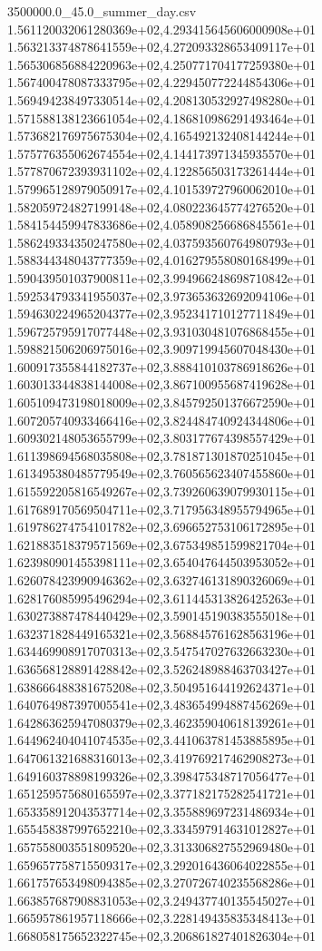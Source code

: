 \begin{filecontents*}{3500000.0_45.0_summer_day.csv}
1.561120032061280369e+02,4.293415645606000908e+01
1.563213374878641559e+02,4.272093328653409117e+01
1.565306856884220963e+02,4.250771704177259380e+01
1.567400478087333795e+02,4.229450772244854306e+01
1.569494238497330514e+02,4.208130532927498280e+01
1.571588138123661054e+02,4.186810986291493464e+01
1.573682176975675304e+02,4.165492132408144244e+01
1.575776355062674554e+02,4.144173971345935570e+01
1.577870672393931102e+02,4.122856503173261444e+01
1.579965128979050917e+02,4.101539727960062010e+01
1.582059724827199148e+02,4.080223645774276520e+01
1.584154459947833686e+02,4.058908256686845561e+01
1.586249334350247580e+02,4.037593560764980793e+01
1.588344348043777359e+02,4.016279558080168499e+01
1.590439501037900811e+02,3.994966248698710842e+01
1.592534793341955037e+02,3.973653632692094106e+01
1.594630224965204377e+02,3.952341710127711849e+01
1.596725795917077448e+02,3.931030481076868455e+01
1.598821506206975016e+02,3.909719945607048430e+01
1.600917355844182737e+02,3.888410103786918626e+01
1.603013344838144008e+02,3.867100955687419628e+01
1.605109473198018009e+02,3.845792501376672590e+01
1.607205740933466416e+02,3.824484740924344806e+01
1.609302148053655799e+02,3.803177674398557429e+01
1.611398694568035808e+02,3.781871301870251045e+01
1.613495380485779549e+02,3.760565623407455860e+01
1.615592205816549267e+02,3.739260639079930115e+01
1.617689170569504711e+02,3.717956348955794965e+01
1.619786274754101782e+02,3.696652753106172895e+01
1.621883518379571569e+02,3.675349851599821704e+01
1.623980901455398111e+02,3.654047644503953052e+01
1.626078423990946362e+02,3.632746131890326069e+01
1.628176085995496294e+02,3.611445313826425263e+01
1.630273887478440429e+02,3.590145190383555018e+01
1.632371828449165321e+02,3.568845761628563196e+01
1.634469908917070313e+02,3.547547027632663230e+01
1.636568128891428842e+02,3.526248988463703427e+01
1.638666488381675208e+02,3.504951644192624371e+01
1.640764987397005541e+02,3.483654994887456269e+01
1.642863625947080379e+02,3.462359040618139261e+01
1.644962404041074535e+02,3.441063781453885895e+01
1.647061321688316013e+02,3.419769217462908273e+01
1.649160378898199326e+02,3.398475348717056477e+01
1.651259575680165597e+02,3.377182175282541721e+01
1.653358912043537714e+02,3.355889697231486934e+01
1.655458387997652210e+02,3.334597914631012827e+01
1.657558003551809520e+02,3.313306827552969480e+01
1.659657758715509317e+02,3.292016436064022855e+01
1.661757653498094385e+02,3.270726740235568286e+01
1.663857687908831053e+02,3.249437740135545027e+01
1.665957861957118666e+02,3.228149435835348413e+01
1.668058175652322745e+02,3.206861827401826304e+01

\end{filecontents*}

